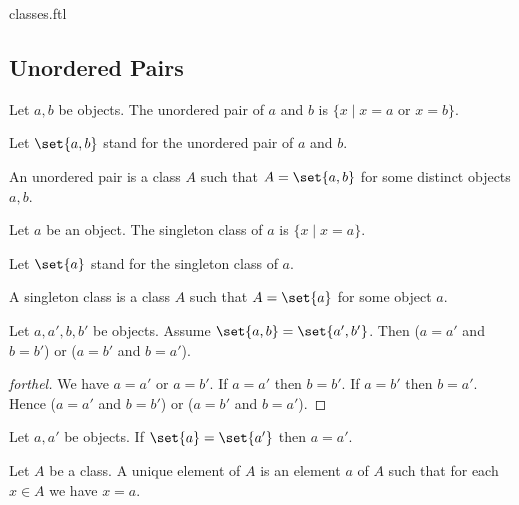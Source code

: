 \documentclass{naproche-library}
\begin{document}
\begin{smodule}{classes.ftl}
  \subsection*{Unordered Pairs}

  \begin{definition}[forthel,id=FOUNDATIONS_01_3471035364016128,printid]
    Let $a, b$ be objects.
    The unordered pair of $a$ and $b$ is $\{ x \mid x = a$ or $x = b \}$.

    Let $\set{a, b}$ stand for the unordered pair of $a$ and $b$.
  \end{definition}

  \begin{definition}[forthel,id=FOUNDATIONS_01_605432672419840,printid]
    An unordered pair is a class $A$ such that $A = \set{a, b}$ for some distinct objects $a, b$.
  \end{definition}

  \begin{definition}[forthel,id=FOUNDATIONS_01_1160414603771904,printid]
    Let $a$ be an object.
    The singleton class of $a$ is $\{ x \mid x = a \}$.

    Let $\set{a}$ stand for the singleton class of $a$.
  \end{definition}

  \begin{definition}[forthel,id=FOUNDATIONS_01_6786618161627136,printid]
    A singleton class is a class $A$ such that $A = \set{a}$ for some object $a$.
  \end{definition}

  \begin{proposition}[forthel,id=FOUNDATIONS_01_6125259604361216,printid]
    Let $a, a', b, b'$ be objects.
    Assume $\set{a, b} = \set{a', b'}$.
    Then ($a = a'$ and $b = b'$) or ($a = b'$ and $b = a'$).
  \end{proposition}
  \begin{proof}[forthel]
    We have $a = a'$ or $a = b'$.
    If $a = a'$ then $b = b'$.
    If $a = b'$ then $b = a'$.
    Hence ($a = a'$ and $b = b'$) or ($a = b'$ and $b = a'$).
  \end{proof}

  \begin{corollary}[forthel,id=FOUNDATIONS_01_6954678910713856,printid]
    Let $a, a'$ be objects.
    If $\set{a} = \set{a'}$ then $a = a'$.
  \end{corollary}

  \begin{definition}[forthel,id=FOUNDATIONS_01_29867480293464351,printid]
    Let $A$ be a class.
    A unique element of $A$ is an element $a$ of $A$ such that for each $x \in A$ we have $x = a$.
  \end{definition}


\end{smodule}
\end{document}
